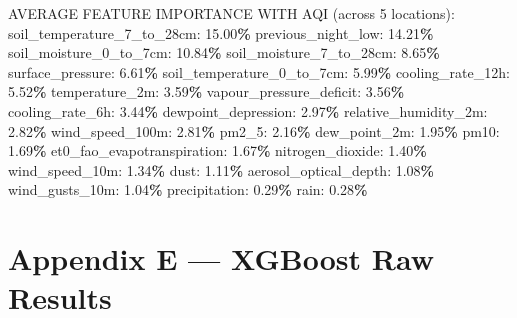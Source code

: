 \documentclass[
  letterpaper,
  DIV=11,
  numbers=noendperiod]{scrartcl}
\newenvironment{Shaded}{\begin{snugshade}}{\end{snugshade}}
\newcommand{\DecValTok}[1]{\textcolor[rgb]{0.00,0.00,0.81}{#1}}
\newcommand{\FloatTok}[1]{\textcolor[rgb]{0.00,0.00,0.81}{#1}}
\newcommand{\NormalTok}[1]{#1}
\newcommand{\OperatorTok}[1]{\textcolor[rgb]{0.81,0.36,0.00}{\textbf{#1}}}
\begin{document}
\begin{Shaded}
\begin{Highlighting}[]
\NormalTok{AVERAGE FEATURE IMPORTANCE WITH AQI (across }\DecValTok{5}\NormalTok{ locations):}
\NormalTok{  soil\_temperature\_7\_to\_28cm: }\FloatTok{15.00}\OperatorTok{\%}
\NormalTok{  previous\_night\_low: }\FloatTok{14.21}\OperatorTok{\%}
\NormalTok{  soil\_moisture\_0\_to\_7cm: }\FloatTok{10.84}\OperatorTok{\%}
\NormalTok{  soil\_moisture\_7\_to\_28cm: }\FloatTok{8.65}\OperatorTok{\%}
\NormalTok{  surface\_pressure: }\FloatTok{6.61}\OperatorTok{\%}
\NormalTok{  soil\_temperature\_0\_to\_7cm: }\FloatTok{5.99}\OperatorTok{\%}
\NormalTok{  cooling\_rate\_12h: }\FloatTok{5.52}\OperatorTok{\%}
\NormalTok{  temperature\_2m: }\FloatTok{3.59}\OperatorTok{\%}
\NormalTok{  vapour\_pressure\_deficit: }\FloatTok{3.56}\OperatorTok{\%}
\NormalTok{  cooling\_rate\_6h: }\FloatTok{3.44}\OperatorTok{\%}
\NormalTok{  dewpoint\_depression: }\FloatTok{2.97}\OperatorTok{\%}
\NormalTok{  relative\_humidity\_2m: }\FloatTok{2.82}\OperatorTok{\%}
\NormalTok{  wind\_speed\_100m: }\FloatTok{2.81}\OperatorTok{\%}
\NormalTok{  pm2\_5: }\FloatTok{2.16}\OperatorTok{\%}
\NormalTok{  dew\_point\_2m: }\FloatTok{1.95}\OperatorTok{\%}
\NormalTok{  pm10: }\FloatTok{1.69}\OperatorTok{\%}
\NormalTok{  et0\_fao\_evapotranspiration: }\FloatTok{1.67}\OperatorTok{\%}
\NormalTok{  nitrogen\_dioxide: }\FloatTok{1.40}\OperatorTok{\%}
\NormalTok{  wind\_speed\_10m: }\FloatTok{1.34}\OperatorTok{\%}
\NormalTok{  dust: }\FloatTok{1.11}\OperatorTok{\%}
\NormalTok{  aerosol\_optical\_depth: }\FloatTok{1.08}\OperatorTok{\%}
\NormalTok{  wind\_gusts\_10m: }\FloatTok{1.04}\OperatorTok{\%}
\NormalTok{  precipitation: }\FloatTok{0.29}\OperatorTok{\%}
\NormalTok{  rain: }\FloatTok{0.28}\OperatorTok{\%}
\end{Highlighting}
\end{Shaded}

\section{Appendix E --- XGBoost Raw
Results}\label{appendix-e-xgboost-raw-results}
\end{document}
